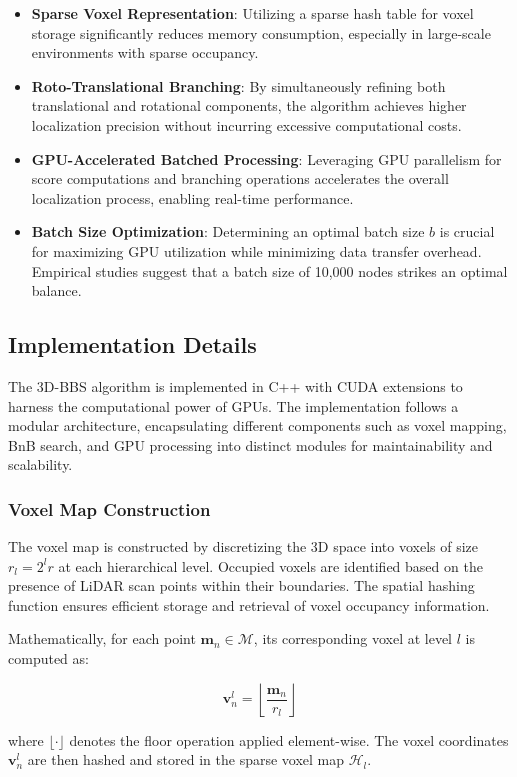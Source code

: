 \begin{itemize}
    \item \textbf{Sparse Voxel Representation}: Utilizing a sparse hash table for voxel storage significantly reduces memory consumption, especially in large-scale environments with sparse occupancy.
    \item \textbf{Roto-Translational Branching}: By simultaneously refining both translational and rotational components, the algorithm achieves higher localization precision without incurring excessive computational costs.
    \item \textbf{GPU-Accelerated Batched Processing}: Leveraging GPU parallelism for score computations and branching operations accelerates the overall localization process, enabling real-time performance.
    \item \textbf{Batch Size Optimization}: Determining an optimal batch size $b$ is crucial for maximizing GPU utilization while minimizing data transfer overhead. Empirical studies suggest that a batch size of 10,000 nodes strikes an optimal balance.
\end{itemize}

\subsection{Implementation Details}
The 3D-BBS algorithm is implemented in C++ with CUDA extensions to harness the computational power of GPUs. The implementation follows a modular architecture, encapsulating different components such as voxel mapping, BnB search, and GPU processing into distinct modules for maintainability and scalability.

\subsubsection{Voxel Map Construction}
The voxel map is constructed by discretizing the 3D space into voxels of size $r_l = 2^l r$ at each hierarchical level. Occupied voxels are identified based on the presence of LiDAR scan points within their boundaries. The spatial hashing function ensures efficient storage and retrieval of voxel occupancy information.

Mathematically, for each point $\mathbf{m}_n \in \mathcal{M}$, its corresponding voxel at level $l$ is computed as:

$$\mathbf{v}_n^l = \left\lfloor \frac{\mathbf{m}_n}{r_l} \right\rfloor$$

where $\lfloor \cdot \rfloor$ denotes the floor operation applied element-wise. The voxel coordinates $\mathbf{v}_n^l$ are then hashed and stored in the sparse voxel map $\mathcal{H}_l$.

